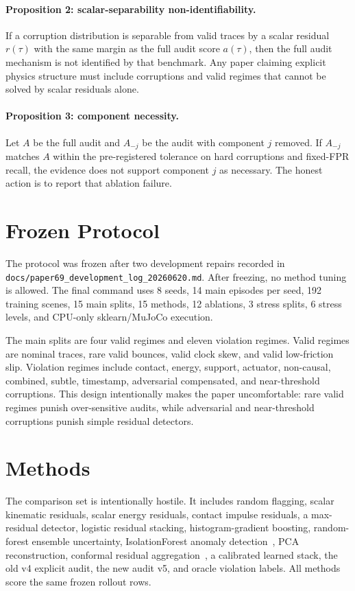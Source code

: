 \documentclass{article}
\begin{document}
\paragraph{Proposition 2: scalar-separability non-identifiability.}
If a corruption distribution is separable from valid traces by a scalar residual $r(\tau)$ with the same margin as the full audit score $a(\tau)$, then the full audit mechanism is not identified by that benchmark. Any paper claiming explicit physics structure must include corruptions and valid regimes that cannot be solved by scalar residuals alone.

\paragraph{Proposition 3: component necessity.}
Let $A$ be the full audit and $A_{-j}$ be the audit with component $j$ removed. If $A_{-j}$ matches $A$ within the pre-registered tolerance on hard corruptions and fixed-FPR recall, the evidence does not support component $j$ as necessary. The honest action is to report that ablation failure.

\section{Frozen Protocol}

The protocol was frozen after two development repairs recorded in \texttt{docs/paper69\_development\_log\_20260620.md}. After freezing, no method tuning is allowed. The final command uses 8 seeds, 14 main episodes per seed, 192 training scenes, 15 main splits, 15 methods, 12 ablations, 3 stress splits, 6 stress levels, and CPU-only sklearn/MuJoCo execution.

The main splits are four valid regimes and eleven violation regimes. Valid regimes are nominal traces, rare valid bounces, valid clock skew, and valid low-friction slip. Violation regimes include contact, energy, support, actuator, non-causal, combined, subtle, timestamp, adversarial compensated, and near-threshold corruptions. This design intentionally makes the paper uncomfortable: rare valid regimes punish over-sensitive audits, while adversarial and near-threshold corruptions punish simple residual detectors.

\section{Methods}

The comparison set is intentionally hostile. It includes random flagging, scalar kinematic residuals, scalar energy residuals, contact impulse residuals, a max-residual detector, logistic residual stacking, histogram-gradient boosting, random-forest ensemble uncertainty, IsolationForest anomaly detection~\citep{liu2008isolation}, PCA reconstruction, conformal residual aggregation~\citep{angelopoulos2021gentle,vovk2005algorithmic}, a calibrated learned stack, the old v4 explicit audit, the new audit v5, and oracle violation labels. All methods score the same frozen rollout rows.
\end{document}
